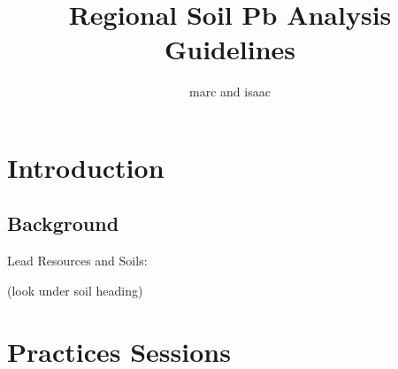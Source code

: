 \documentclass{article}\usepackage[]{graphicx}\usepackage[]{color}
\title{Regional Soil Pb Analysis Guidelines}
\author{marc and isaac}
\begin{document}
\maketitle

\section{Introduction}

\subsection{Background}

Lead Resources and Soils:


(look under soil heading) 

\section{Practices Sessions}
\end{document}

